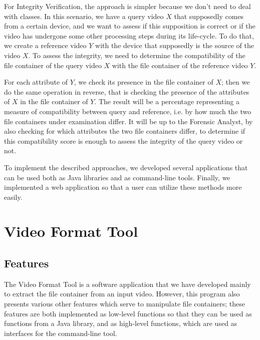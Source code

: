 For Integrity Verification, the approach is simpler because we don't need to deal with classes. In this scenario, we have a query video $X$ that supposedly comes from a certain device, and we want to assess if this supposition is correct or if the video has undergone some other processing steps during its life-cycle. To do that, we create a reference video $Y$ with the device that supposedly is the source of the video $X$. To assess the integrity, we need to determine the compatibility of the file container of the query video $X$ with the file container of the reference video $Y$. 

For each attribute of $Y$, we check its presence in the file container of $X$; then we do the same operation in reverse, that is checking the presence of the attributes of $X$ in the file container of $Y$. The result will be a percentage representing a measure of compatibility between query and reference, i.e. by how much the two file containers under examination differ. It will be up to the Forensic Analyst, by also checking for which attributes the two file containers differ, to determine if this compatibility score is enough to assess the integrity of the query video or not. \newline

To implement the described approaches, we developed several applications that can be used both as Java libraries and as command-line tools. Finally, we implemented a web application so that a user can utilize these methods more easily.

\section{Video Format Tool}

\subsection{Features}

The Video Format Tool is a software application that we have developed mainly to extract the file container from an input video. However, this program also presents various other features which serve to manipulate file containers; these features are both implemented as low-level functions so that they can be used as functions from a Java library, and as high-level functions, which are used as interfaces for the command-line tool.

